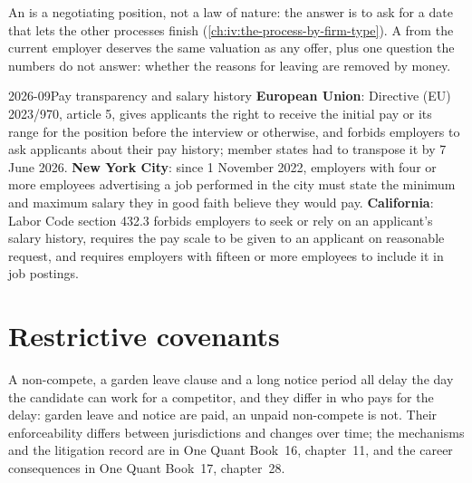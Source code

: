 An  is a negotiating position, not a law of nature: the answer is to ask for a date that lets
the other processes finish (\cref{ch:iv:the-process-by-firm-type}). A  from the current employer
deserves the same valuation as any offer, plus one question the numbers do not answer: whether the reasons
for leaving are removed by money.

\begin{dated}{2026-09}{Pay transparency and salary history}\label{dat:iv:offers-compensation-and-non-competes:law}
\textbf{European Union}: Directive (EU) 2023/970, article 5, gives applicants the right to receive the initial
pay or its range for the position before the interview or otherwise, and forbids employers to ask applicants
about their pay history; member states had to transpose it by 7 June 2026. \textbf{New York City}: since 1
November 2022, employers with four or more employees advertising a job performed in the city must state the
minimum and maximum salary they in good faith believe they would pay. \textbf{California}: Labor Code section
432.3 forbids employers to seek or rely on an applicant's salary history, requires the pay scale to be given
to an applicant on reasonable request, and requires employers with fifteen or more employees to include it in
job postings.
\end{dated}

\section{Restrictive covenants}

A non-compete, a garden leave clause and a long notice period all delay the day the candidate can work for a
competitor, and they differ in who pays for the delay: garden leave and notice are paid, an unpaid non-compete
is not. Their enforceability differs between jurisdictions and changes over time; the mechanisms and the
litigation record are in One Quant Book~16, chapter~11, and the career consequences in One Quant Book~17,
chapter~28.

